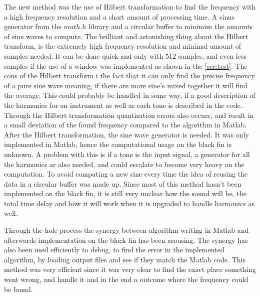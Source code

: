 The new method was the use of Hilbert transformation to find the frequency with a high frequency resolution and a short amount of processing time.
A sinus generator from the $math.h$ library and a circular buffer to minimize the amounts of sine waves to compute.
The brilliant and astonishing thing about the Hilbert transform, is the extremely high frequency resolution and minimal amount of samples needed.
It can be done quick and only with 512 samples, and even less samples if the use of a window was implemented as shown in the \cref{sec:test}.
The cons of the Hilbert transform i the fact that it can only find the precise frequency of a pure sine wave meaning, if there are more sine's mixed together it will find the average.
This could probably be handled in some way, if a good description of the harmonics for an instrument as well as each tone is described in the code.
Through the Hilbert transformation quantization errors also occurs, and result in a small deviation of the found frequency compared to the algorithm in Matlab. 
After the Hilbert transformation, the sine wave generator is needed.
It was only implemented in Matlab, hence the computational usage on the black fin is unknown.
A problem with this is if a tone is the input signal, a generator for all the harmonics ar also needed, and could escalate to become very heavy on the computation.
To avoid computing a new sine every time the idea of reusing the data in a circular buffer was made up. 
Since most of this method hasn't been implemented on the black fin, it is still very unclear how the sound will be, the total time delay and how it will work when it is upgraded to handle harmonics as well.

Through the hole process the synergy between algorithm writing in Matlab and afterwards implementation on the black fin has been arousing.
The synergy has also been used efficiently to debug, to find the error in the implemented algorithm, by loading output files and see if they match the Matlab code.
This method was very efficient since it was very clear to find the exact place something went wrong, and handle it and in the end a outcome where the frequency could be found.   

